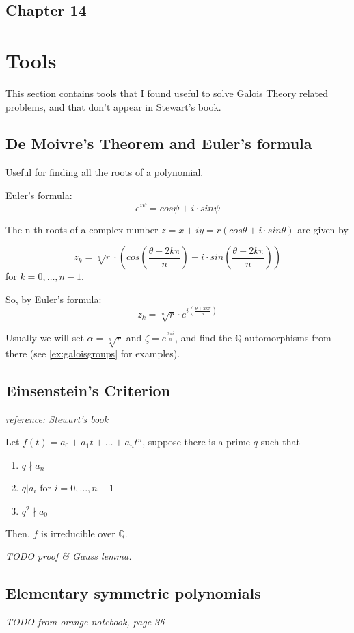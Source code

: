 \documentclass{article}
\theoremstyle{definition}
\begin{document}
\subsection{Chapter 14}


\newpage

\section{Tools}
This section contains tools that I found useful to solve Galois Theory related problems, and that don't appear in Stewart's book.

\subsection{De Moivre's Theorem and Euler's formula}\label{demoivre}
Useful for finding all the roots of a polynomial.

Euler's formula:
$$e^{i \psi} = cos \psi + i \cdot sin \psi$$

The n-th roots of a complex number $z=x + i y = r (cos \theta + i \cdot sin \theta)$ are given by

$$z_k = \sqrt[n]{r} \cdot \left(cos(\frac{\theta + 2k \pi}{n}) + i \cdot sin(\frac{\theta + 2k \pi}{n}) \right)$$
for $k=0, \ldots, n-1$.

So, by Euler's formula:
$$z_k = \sqrt[n]{r} \cdot e^{i (\frac{\theta + 2 k \pi}{n})}$$

Usually we will set $\alpha=\sqrt[n]{r}$ and $\zeta = e^{\frac{2 \pi i}{n}}$,
and find the $\mathbb{Q}$-automorphisms from there (see \ref{ex:galoisgroups} for examples).

\subsection{Einsenstein's Criterion} \label{einsenstein}
\emph{reference: Stewart's book}

Let $f(t) = a_0 + a_1 t + \ldots + a_n t^n$, suppose there is a prime $q$ such that
\begin{enumerate}
  \item $q \nmid a_n$
  \item $q | a_i$ for $i=0, \ldots, n-1$
  \item $q^2 \nmid a_0$
\end{enumerate}
Then, $f$ is irreducible over $\mathbb{Q}$.

\emph{TODO proof \& Gauss lemma.}


\subsection{Elementary symmetric polynomials}
\emph{TODO from orange notebook, page 36}
\end{document}

